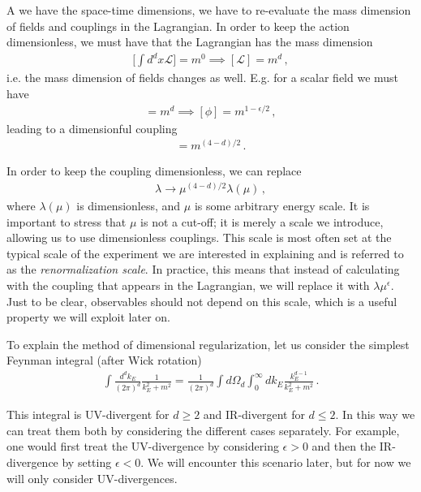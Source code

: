 A we have  the space-time dimensions, we have to re-evaluate the mass dimension of fields and couplings in the Lagrangian. In order to keep the action dimensionless, we must have that the Lagrangian has the mass dimension
\begin{align}
    \Big[\int d^{d}x\mathcal{L}\Big]=m^{0}\implies [\mathcal{L}]=m^{d}\,,
\end{align}
i.e. the mass dimension of fields changes as well. E.g. for a scalar field we must have
\begin{align}
    [(\partial_{\mu}\phi)^{2}]=m^{d}\implies [\phi]=m^{1-\epsilon/2}\,,
\end{align}
leading to a dimensionful coupling
\begin{align}
    [\lambda]=m^{(4-d)/2}\,.
\end{align}

In order to keep the coupling dimensionless, we can replace
\begin{align}
    \lambda\rightarrow\mu^{(4-d)/2}\lambda(\mu)\,,
\end{align}
where $\lambda(\mu)$ is dimensionless, and $\mu$ is some arbitrary energy scale. It is important to stress that $\mu$ is not a cut-off; it is merely a scale we introduce, allowing us to use dimensionless couplings. This scale is most often set at the typical scale of the experiment we are interested in explaining and is referred to as the \emph{renormalization scale}. In practice, this means that instead of calculating with the coupling that appears in the Lagrangian, we will replace it with $\lambda\mu
^{\epsilon}$. Just to be clear, observables should not depend on this scale, which is a useful property we will exploit later on.

To explain the method of dimensional regularization, let us consider the simplest Feynman integral (after Wick rotation)
\begin{align}
    \int\frac{d^{d}k_E}{(2\pi)^{d}}\frac{1}{k_{E}^{2}+m^{2}}=\frac{1}{(2\pi)^{d}}\int d\Omega_{d}\int_{0}^{\infty}dk_{E}\frac{k_{E}^{d-1}}{k_{E}^{2}+m^{2}}\,.
\end{align}

This integral is UV-divergent for $d\geq 2$ and IR-divergent for $d\leq 2$. In this way we can treat them both by considering the different cases separately. For example, one would first treat the UV-divergence by considering $\epsilon>0$ and then the IR-divergence by setting $\epsilon<0$. We will encounter this scenario later, but for now we will only consider UV-divergences.

